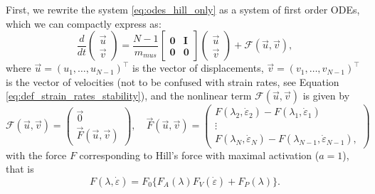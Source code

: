 \documentclass{sfuthesis}
\numberwithin{equation}{section}
\numberwithin{figure}{chapter}
\numberwithin{table}{chapter}
\theoremstyle{definition}
\def\*#1{{\mathbf{#1}}} %
\newcommand{\depsilon}{\dot{\varepsilon}}
\begin{document}
First, we rewrite the system \eqref{eq:odes_hill_only} as a system of first order ODEs, which we can compactly express as:
\begin{equation} \label{eq:odes_hill_only_first_order}
\dfrac{d}{dt} \begin{pmatrix}
    \vec{u} \\ \vec{v} 
\end{pmatrix} = \dfrac{N-1}{m_{mus}}\begin{bmatrix}
    \*0 & \*I \\ \*0 & \*0
\end{bmatrix} \begin{pmatrix}
    \vec{u} \\ \vec{v} 
\end{pmatrix} + \mathcal{F}(\vec{u}, \vec{v}),
\end{equation}
where $\vec{u} = (u_1, \dots, u_{N-1})^\top$ is the vector of displacements, $\vec{v} = (v_1, \dots, v_{N-1})^\top$ is the vector of velocities (not to be confused with strain rates, see Equation \eqref{eq:def_strain_rates_stability}), and the nonlinear term $\mathcal{F}(\vec{u}, \vec{v})$ is given by
\begin{equation} \label{eq:def_nonlinear_force_term}
    \mathcal{F}(\vec{u}, \vec{v}) = \begin{pmatrix}
        \vec{0} \\ \vec{F}(\vec{u}, \vec{v})
    \end{pmatrix}, \quad 
    \vec{F}(\vec{u},\vec{v}) = \begin{pmatrix}
        F(\lambda_2, \depsilon_2) - F(\lambda_1, \depsilon_1) \\
        \vdots \\
        F(\lambda_N, \depsilon_N) - F(\lambda_{N-1}, \depsilon_{N-1}),
    \end{pmatrix}
\end{equation}
with the force $F$ corresponding to Hill's force with maximal activation ($a=1$), that is
\begin{equation}
    F(\lambda, \depsilon) = F_0 \Big\{ F_A(\lambda)F_V(\depsilon) + F_P(\lambda) \Big\}.
\end{equation}
\end{document}
